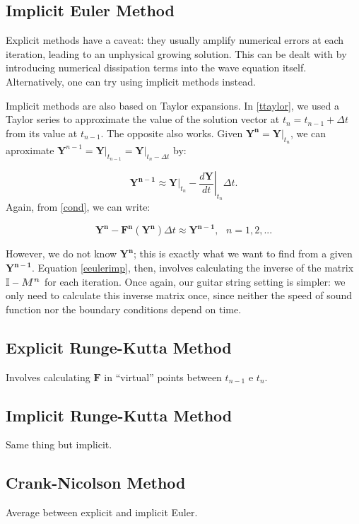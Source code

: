\documentclass{article}
\begin{document}
\subsection{Implicit Euler Method}

Explicit methods have a caveat: they usually amplify numerical errors at each iteration, leading to an unphysical growing solution. This can be dealt with by introducing numerical dissipation terms into the wave equation itself. Alternatively, one can try using implicit methods instead.

Implicit methods are also based on Taylor expansions. In \eqref{ttaylor}, we used a Taylor series to approximate the value of the solution vector at $t_n=t_{n-1}+\Delta t$ from its value at $t_{n-1}$. The opposite also works. Given $\bm{Y^n}=\left.\bm{Y}\right|_{t_n}$, we can aproximate $\bm{Y}^{n-1}=\left.\bm{Y}\right|_{t_{n-1}}=\left.\bm{Y}\right|_{t_n-\Delta t}$ by:

\begin{equation}\label{ttaylorimp}
\bm{Y^{n-1}}\approx\left.\bm{Y}\right|_{t_{n}}-\left.\frac{d \bm{Y}}{d t}\right|_{t_{n}}\Delta t.
\end{equation}
Again, from \eqref{cond}, we can write:

\begin{equation}\label{eeulerimp}
\boxed{\bm{Y^{n}}-\bm{F^{n}}(\bm{Y^n})\Delta t\approx\bm{Y^{n-1}}, \text{ }n=1,2,...}
\end{equation}

However, we do not know $\bm{Y^n}$; this is exactly what we want to find from a given $\bm{Y^{n-1}}$. Equation \eqref{eeulerimp}, then, involves calculating the inverse of the matrix $\bm{\mathbb{I}}-\textcolor{grayII}{\bm{M^n}}$ for each iteration. Once again, our guitar string setting is simpler: we only need to calculate this inverse matrix once, since neither the speed of sound function nor the boundary conditions depend on time.

\subsection{Explicit Runge-Kutta Method}
Involves calculating $\bm{F}$ in ``virtual'' points between $t_{n-1}$ e $t_{n}$.

\subsection{Implicit Runge-Kutta Method}
Same thing but implicit.

\subsection{Crank-Nicolson Method}
Average between explicit and implicit Euler.
\end{document}
